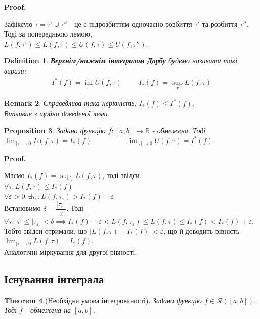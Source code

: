 \documentclass[a4paper, 10pt]{article}
\makeatletter
\def\huge{\displaystyle}
\def\qed{$\blacksquare$}
\theoremstyle{theoremdd}
\newtheorem{theorem}{Theorem}[subsection]
\theoremstyle{theoremdd}
\theoremstyle{theoremdd}
\newtheorem{definition}[theorem]{Definition}
\theoremstyle{theoremdd}
\theoremstyle{theoremdd}
\theoremstyle{theoremdd}
\newtheorem{proposition}[theorem]{Proposition}
\theoremstyle{theoremdd}
\newtheorem{remark}[theorem]{Remark}
\theoremstyle{theoremdd}
\theoremstyle{theoremdd}
\renewenvironment{proof}[1][Proof.\\]{\par
\pushQED{\hfill \qed}%
\normalfont \topsep6\p@\@plus6\p@\relax
\trivlist
\item\relax
{\bfseries
#1\@addpunct{.}}\hspace\labelsep\ignorespaces
}{%
\popQED\endtrivlist\@endpefalse
}
\makeatother
\begin{document}
\begin{proof}
Зафіксую $\tau = \tau' \cup \tau''$ - це є підрозбиттям одночасно розбиття $\tau'$ та розбиття $\tau''$. Тоді за попередньою лемою,\\
$L(f,\tau') \leq L(f,\tau) \leq U(f,\tau) \leq U(f,\tau'')$.
\end{proof}

\begin{definition}
\textbf{Верхнім/нижнім інтегралом Дарбу} будемо називати такі вирази:
\begin{align*}
I^*(f) = \inf_\tau U(f, \tau) \hspace{1cm} I_*(f) = \sup_\tau L(f,\tau)
\end{align*}
\end{definition}

\begin{remark}
Справедлива така нерівність: $I_*(f) \leq I^*(f)$.\\
\textit{Випливає з щойно доведеної леми.}
\end{remark}

\begin{proposition}
Задано функцію $f: [a,b] \to \mathbb{R}$ - обмежена. Тоді\\
$\huge\lim_{|\tau| \to 0} L(f,\tau) = I_*(f) \hspace{2cm} \lim_{|\tau| \to 0} U(f,\tau) = I^*(f)$.
\end{proposition}

\begin{proof}
Маємо $I_*(f) = \huge\sup_\tau L(f,\tau)$, тоді звідси\\
$\forall \tau: L(f,\tau) \leq I_*(f)$\\
$\forall \varepsilon > 0: \exists \tau_\varepsilon: L(f,\tau_\varepsilon) > I_*(f) - \varepsilon$.\\
Встановимо $\delta = \dfrac{|\tau_\varepsilon|}{2}$. Тоді $\forall \tau: |\tau| \leq |\tau_\varepsilon| < \delta \implies I_*(f) - \varepsilon < L(f,\tau_\varepsilon) \leq L(f,\tau) \leq I_*(f) < I_*(f) + \varepsilon$.\\
Тобто звідси отримали, що $|L(f,\tau) - I_*(f)| < \varepsilon$, що й доводить рівність $\huge\lim_{|\tau| \to 0} L(f,\tau) = I_*(f)$.\\
Аналогічні міркування для другої рівності.
\end{proof}

\subsection{Існування інтеграла}
\begin{theorem}[Необхідна умова інтегрованості]
Задано функцію $f \in \mathcal{R}([a,b])$. Тоді $f$ - обмежена на $[a,b]$.
\end{theorem}
\end{document}
